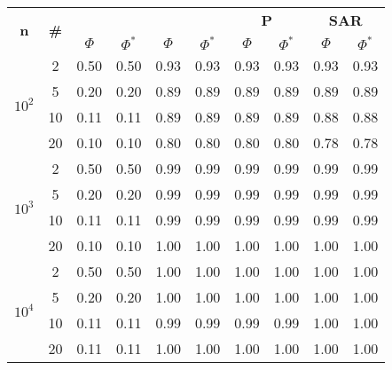 \begin{table}
\begin{small}
		\bigskip
		\begin{tabular}{|c|c|cc|cc|cc|cc|}
			\hline
			\multirow{2}{*}{\textbf{n}} &
			\multirow{2}{*}{\textbf{\#}} &
			\multicolumn{2}{c|}{\textbf{\astar}} &
			\multicolumn{2}{c|}{\textbf{\ambush}} &
			\multicolumn{2}{c|}{\textbf{P}} &
			\multicolumn{2}{c|}{\textbf{SAR}}\\
			& & $\Phi$ & $\Phi^*$ & $\Phi$ & $\Phi^*$&
			$\Phi$ & $\Phi^*$& $\Phi$ & $\Phi^*$\\
			\hline
			\multirow{4}{*}{$10^2$}
			 & 2 & 0.50 & 0.50 & 0.93 & 0.93 & 0.93 & 0.93 & 0.93 & 0.93\\
			 & 5 & 0.20 & 0.20 & 0.89 & 0.89 & 0.89 & 0.89 & 0.89 & 0.89\\
			 & 10 & 0.11 & 0.11 & 0.89 & 0.89 & 0.89 & 0.89 & 0.88 & 0.88\\
			 & 20 & 0.10 & 0.10 & 0.80 & 0.80 & 0.80 & 0.80 & 0.78 & 0.78\\
			\hline
			\multirow{4}{*}{$10^3$}
			 & 2 & 0.50 & 0.50 & 0.99 & 0.99 & 0.99 & 0.99 & 0.99 & 0.99\\
			 & 5 & 0.20 & 0.20 & 0.99 & 0.99 & 0.99 & 0.99 & 0.99 & 0.99\\
			 & 10 & 0.11 & 0.11 & 0.99 & 0.99 & 0.99 & 0.99 & 0.99 & 0.99\\
			 & 20 & 0.10 & 0.10 & 1.00 & 1.00 & 1.00 & 1.00 & 1.00 & 1.00\\
			 \hline
			\multirow{4}{*}{$10^4$}
			 & 2 & 0.50 & 0.50 & 1.00 & 1.00 & 1.00 & 1.00 & 1.00 & 1.00\\
			 & 5 & 0.20 & 0.20 & 1.00 & 1.00 & 1.00 & 1.00 & 1.00 & 1.00\\
			 & 10 & 0.11 & 0.11 & 0.99 & 0.99 & 0.99 & 0.99 & 1.00 & 1.00\\
			 & 20 & 0.11 & 0.11 & 1.00 & 1.00 & 1.00 & 1.00 & 1.00 & 1.00\\
			 \hline
		\end{tabular}
	\end{small}
\end{table}
